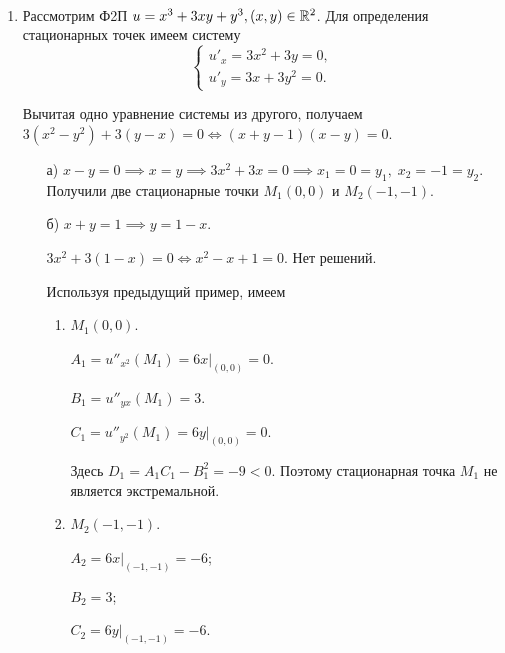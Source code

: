 \documentclass[../../main.tex]{subfiles}
\begin{document}
    \begin{exmps}
    ~
    \begin{enumerate}[label=\arabic*)]
        \item Рассмотрим Ф2П $u = x^3 + 3xy + y^3, (x,y) \in \mathbb{R}^2$. Для
        определения стационарных точек имеем систему
        \[
        \begin{cases}
            u'_x = 3x^2 + 3y = 0, \\
            u'_y = 3x + 3y^2 = 0.
        \end{cases}
        \]

        Вычитая одно уравнение системы из другого, получаем $3(x^2 - y^2) +
        3(y - x) = 0 \iff (x+y-1)(x-y)=0$.
        \begin{itemize}
            \item[а)] $x - y = 0 \implies x = y \implies 3x^2 + 3x = 0 \implies
            x_1 = 0 = y_1, \; x_2 = -1 = y_2$.
            Получили две стационарные точки $M_1(0,0)$ и $M_2(-1,-1)$.
            \item[б)] $x+y=1 \implies y = 1-x$.

            $3x^2 + 3(1-x) = 0 \iff x^2 - x + 1 = 0$. Нет решений.

            Используя предыдущий пример, имеем
            \begin{enumerate}[label=\arabic*.]
                \item $M_1(0,0)$.

                $A_1 = u''_{x^2} (M_1) = 6x \big|_{(0,0)} = 0$.

                $B_1 = u''_{yx} (M_1) = 3$.

                $C_1 = u''_{y^2} (M_1) = 6y \big|_{(0,0)} = 0$.

                Здесь $D_1 = A_1C_1 - B_1^2 = -9 < 0$. Поэтому стационарная
                точка $M_1$ не является экстремальной.

                \item $M_2 (-1, -1)$.

                $A_2 = 6x \big|_{(-1,-1)} = -6$;

                $B_2 = 3$;

                $C_2 = 6y \big|_{(-1,-1)} = -6$.


\end{enumerate}
\end{itemize}
\end{enumerate}
\end{exmps}
\end{document}
